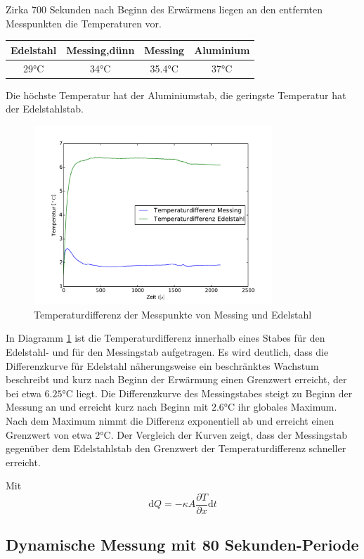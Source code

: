 Zirka 700 Sekunden nach Beginn des Erwärmens liegen an den entfernten Messpunkten die Temperaturen vor. 
\begin{table}
\centering
\begin{tabular}{cccc}
	\toprule
	{Edelstahl}&{Messing,dünn}&{Messing}&{Aluminium}\\
	\midrule
	29$\si{\degreeCelsius}$& 34$\si{\degreeCelsius}$& 35.4$\si{\degreeCelsius}$& 37$\si{\degreeCelsius}$\\
	\bottomrule
\end{tabular}
\end{table}
Die höchste Temperatur hat der Aluminiumstab, die geringste Temperatur hat der Edelstahlstab.
\begin{figure}[p]
	\label{fig:tempverl}
	\centering
	\includegraphics[width=0.8\textwidth]{Bilder/M1_Tempdiff.pdf}
	\caption{Temperaturdifferenz der Messpunkte von Messing und Edelstahl}
\end{figure}
In Diagramm \ref{fig:tempverl} ist die Temperaturdifferenz innerhalb eines Stabes für den Edelstahl- und für den Messingstab aufgetragen. 
Es wird deutlich, dass die Differenzkurve für Edelstahl näherungsweise ein beschränktes Wachstum beschreibt und kurz nach Beginn der Erwärmung einen Grenzwert erreicht, der bei etwa  $6.25 \si{\degreeCelsius}$ liegt.
Die Differenzkurve des Messingstabes steigt zu Beginn der Messung an und erreicht kurz nach Beginn mit $2.6 \si{\degreeCelsius}$ ihr globales Maximum. 
Nach dem Maximum nimmt die Differenz exponentiell ab und erreicht einen Grenzwert von etwa $2 \si{\degreeCelsius}$.
Der Vergleich der Kurven zeigt, dass der Messingstab gegenüber dem Edelstahlstab den Grenzwert der Temperaturdifferenz schneller erreicht.


Mit 
\begin{equation}
	\mathup{d}Q = -\kappa A\frac{\partial T}{\partial x}\mathup{d}t
	\label{eq:skr1}
\end{equation}
\subsection{Dynamische Messung mit 80 Sekunden-Periode}
